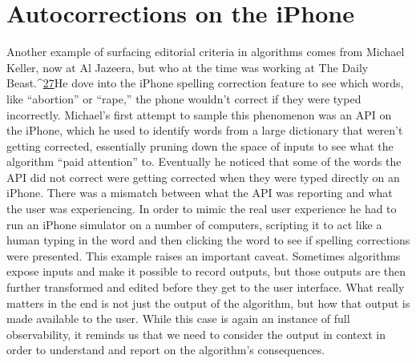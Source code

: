 \section{Autocorrections on the iPhone }
Another example of surfacing editorial criteria in algorithms comes from Michael Keller, now at Al Jazeera, but who at the time was working at The Daily Beast.^{\href{#endnotes}{27}}He dove into the iPhone spelling correction feature to see which words, like ``abortion'' or ``rape,'' the phone wouldn't correct if they were typed incorrectly. 
Michael's first attempt to sample this phenomenon was an API on the iPhone, which he used to identify words from a large dictionary that weren't getting corrected, essentially pruning down the space of inputs to see what the algorithm ``paid attention'' to. Eventually he noticed that some of the words the API did not correct were getting corrected when they were typed directly on an iPhone. There was a mismatch between what the API was reporting and what the user was experiencing. In order to mimic the real user experience he had to run an iPhone simulator on a number of computers, scripting it to act like a human typing in the word and then clicking the word to see if spelling corrections were presented. 
This example raises an important caveat. Sometimes algorithms expose inputs and make it possible to record outputs, but those outputs are then further transformed and edited before they get to the user interface. What really matters in the end is not just the output of the algorithm, but how that output is made available to the user. While this case is again an instance of full observability, it reminds us that we need to consider the output in context in order to understand and report on the algorithm's consequences. 
